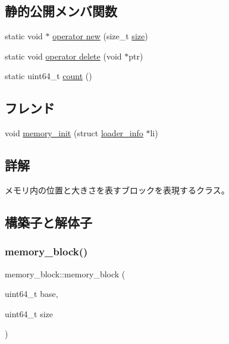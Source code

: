 \subsection*{静的公開メンバ関数}
\begin{DoxyCompactItemize}
\item 
static void $\ast$ \hyperlink{classmemory__block_a649a913a12355b1e28e0338f64f346d8}{operator new} (size\+\_\+t \hyperlink{classmemory__block_adb448dde189fdedec8793fd3dcb4674a}{size})
\item 
static void \hyperlink{classmemory__block_ad053b85f1ebbd81d801dc7e492fd4264}{operator delete} (void $\ast$ptr)
\item 
static uint64\+\_\+t \hyperlink{classmemory__block_a8573ce38e735adf5fbf8a04165308c74}{count} ()
\end{DoxyCompactItemize}
\subsection*{フレンド}
\begin{DoxyCompactItemize}
\item 
void \hyperlink{classmemory__block_a8840f01b46a3b9c43a461591a579c1bd}{memory\+\_\+init} (struct \hyperlink{structloader__info}{loader\+\_\+info} $\ast$li)
\end{DoxyCompactItemize}


\subsection{詳解}
メモリ内の位置と大きさを表すブロックを表現するクラス。 

\subsection{構築子と解体子}
\hypertarget{classmemory__block_a5e72abe346014b328921130d6576ffaa}{}\label{classmemory__block_a5e72abe346014b328921130d6576ffaa} 
\subsubsection{\texorpdfstring{memory\+\_\+block()}{memory\_block()}\hspace{0.1cm}{\footnotesize\ttfamily [1/4]}}
{\footnotesize\ttfamily memory\+\_\+block\+::memory\+\_\+block (\begin{DoxyParamCaption}\item[{uint64\+\_\+t}]{base,  }\item[{uint64\+\_\+t}]{size }\end{DoxyParamCaption})}

